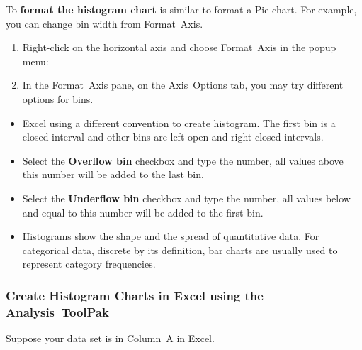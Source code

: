 To \textbf{format the histogram chart} is similar to format a Pie chart.
For example, you can change bin width from \textsf{Format\ Axis}.

\begin{enumerate}[sepno]
\item
  Right-click on the horizontal axis and choose \textsf{Format\ Axis} in
  the popup menu:
\item
  In the \textsf{Format\ Axis} pane, on the \textsf{Axis\ Options} tab,
  you may try different options for bins.
\end{enumerate}

\begin{remark}

\begin{itemize}
\item
  Excel using a different convention to create histogram. The first bin
  is a closed interval and other bins are left open and right closed
  intervals.
\item
  Select the \textbf{Overflow bin} checkbox and type the number, all
  values above this number will be added to the last bin.
\item
  Select the \textbf{Underflow bin} checkbox and type the number, all
  values below and equal to this number will be added to the first bin.
\item
  Histograms show the shape and the spread of quantitative data. For
  categorical data, discrete by its definition, bar charts are usually
  used to represent category frequencies.
\end{itemize}

\end{remark}

\hypertarget{create-histogram-charts-in-excel-using-the-analysis-toolpak}{%
\subsubsection{\texorpdfstring{Create Histogram Charts in Excel using the
\textsf{Analysis\ ToolPak}}{Create Histogram Charts in Excel using the Analysis ToolPak}}\label{create-histogram-charts-in-excel-using-the-analysis-toolpak}}

Suppose your data set is in \textsf{Column\ A} in Excel.

